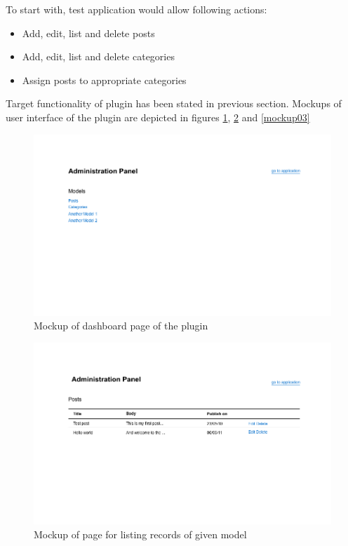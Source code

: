 	To start with, test application would allow following actions:
	\begin{itemize}
	  \item Add, edit, list and delete posts
	  \item Add, edit, list and delete categories
    \item Assign posts to appropriate categories
	\end{itemize}
	
  Target functionality of plugin has been stated in previous section. Mockups of user interface of the plugin are depicted in figures  \ref{mockup01}, \ref{mockup02} and \ref{mockup03}
	
	\begin{figure}[hbt!]
		\begin{center}
			\includegraphics[width=\linewidth]{images/chapter02/mockup01.png}
			\caption{Mockup of dashboard page of the plugin}
			\label{mockup01}
		\end{center}
	\end{figure}
	
	\begin{figure}[hbt!]
		\begin{center}
			\includegraphics[width=\linewidth]{images/chapter02/mockup02.png}
			\caption{Mockup of page for listing records of given model}
			\label{mockup02}
		\end{center}
	\end{figure}
	
